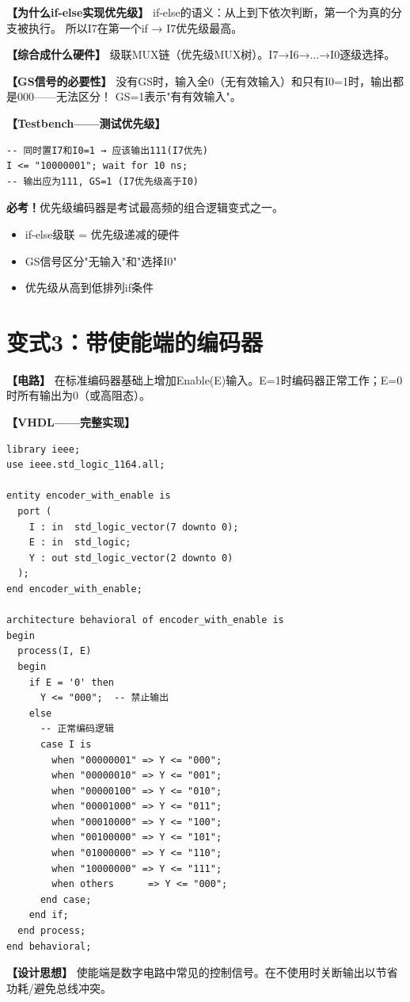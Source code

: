 \begin{detailbox}[完整教学]
\textbf{【为什么if-else实现优先级】}
if-else的语义：从上到下依次判断，第一个为真的分支被执行。
所以I7在第一个if → I7优先级最高。

\textbf{【综合成什么硬件】}
级联MUX链（优先级MUX树）。I7→I6→...→I0逐级选择。

\textbf{【GS信号的必要性】}
没有GS时，输入全0（无有效输入）和只有I0=1时，输出都是000——无法区分！
GS=1表示"有有效输入"。

\textbf{【Testbench——测试优先级】}
\begin{lstlisting}
-- 同时置I7和I0=1 → 应该输出111(I7优先)
I <= "10000001"; wait for 10 ns;
-- 输出应为111, GS=1 (I7优先级高于I0)
\end{lstlisting}

\begin{examfocus}
\textbf{必考！}优先级编码器是考试最高频的组合逻辑变式之一。
\begin{itemize}
  \item if-else级联 = 优先级递减的硬件
  \item GS信号区分"无输入"和"选择I0"
  \item 优先级从高到低排列if条件
\end{itemize}
\end{examfocus}

\end{detailbox}


\section{变式3：带使能端的编码器}

\begin{detailbox}[完整教学]

\textbf{【电路】}
在标准编码器基础上增加Enable(E)输入。E=1时编码器正常工作；E=0时所有输出为0（或高阻态）。

\textbf{【VHDL——完整实现】}
\begin{lstlisting}[caption={带使能端的8-3编码器VHDL实现}]
library ieee;
use ieee.std_logic_1164.all;

entity encoder_with_enable is
  port (
    I : in  std_logic_vector(7 downto 0);
    E : in  std_logic;
    Y : out std_logic_vector(2 downto 0)
  );
end encoder_with_enable;

architecture behavioral of encoder_with_enable is
begin
  process(I, E)
  begin
    if E = '0' then
      Y <= "000";  -- 禁止输出
    else
      -- 正常编码逻辑
      case I is
        when "00000001" => Y <= "000";
        when "00000010" => Y <= "001";
        when "00000100" => Y <= "010";
        when "00001000" => Y <= "011";
        when "00010000" => Y <= "100";
        when "00100000" => Y <= "101";
        when "01000000" => Y <= "110";
        when "10000000" => Y <= "111";
        when others      => Y <= "000";
      end case;
    end if;
  end process;
end behavioral;
\end{lstlisting}

\textbf{【设计思想】}
使能端是数字电路中常见的控制信号。在不使用时关断输出以节省功耗/避免总线冲突。

\end{detailbox}


